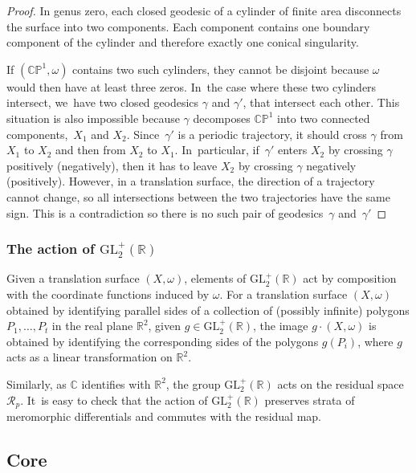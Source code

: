 \documentclass[JEP,XML,SOM,Unicode,NoFloatCountersInSection,published]{cedram}
\theoremstyle{definition}
\begin{document}
\begin{proof}
In genus zero, each closed geodesic of a cylinder of finite area disconnects the surface into two components. Each component contains one boundary component of the cylinder and therefore exactly one conical singularity.

If $(\mathbb{CP}^{1},\omega)$ contains two such cylinders, they cannot be disjoint because $\omega$ would then have at least three zeros. In~the case where these two cylinders intersect, we~have two closed geodesics $\gamma$ and $\gamma'$, that intersect each other. This situation is also impossible because $\gamma$ decomposes $\mathbb{CP}^{1}$ into two connected components,~$X_{1}$ and $X_{2}$. Since~$\gamma'$ is a periodic trajectory, it should cross $\gamma$ from $X_{1}$ to $X_{2}$ and then from $X_{2}$ to $X_{1}$. In~particular, if~$\gamma'$ enters $X_{2}$ by crossing $\gamma$ positively (\resp negatively), then it has to leave $X_{2}$ by crossing $\gamma$ negatively (positively). However, in a translation surface, the direction of a trajectory cannot change, so all intersections between the two trajectories have the same sign. This is a contradiction so there is no such pair of geodesics~$\gamma$ and~$\gamma'$
\end{proof}

\subsubsection{The action of $\mathrm{GL}_{2}^{+}(\mathbb{R})$}\label{subsub:action}

Given a translation surface $(X,\omega)$, elements of $\mathrm{GL}_{2}^{+}(\mathbb{R})$ act by composition with the coordinate functions induced by $\omega$. For a translation surface $(X,\omega)$ obtained by identifying parallel sides of a collection of (possibly infinite) polygons $P_{1},\dots,P_{t}$ in the real plane $\mathbb{R}^{2}$, given $g\in \mathrm{GL}_{2}^{+}(\mathbb{R})$, the image $g\cdot(X,\omega)$ is obtained by identifying the corresponding sides of the polygons $g(P_i)$, where $g$ acts as a linear transformation on $\mathbb{R}^{2}$.

Similarly, as $\mathbb{C}$ identifies with $\mathbb{R}^{2}$, the group $\mathrm{GL}_{2}^{+}(\mathbb{R})$ acts on the residual space~$\mathcal{R}_p$. It~is easy to check that the action of $\mathrm{GL}_{2}^{+}(\mathbb{R})$ preserves strata of meromorphic differentials and commutes with the residual map.

\subsection{Core}\label{sub:core}
\end{document}
